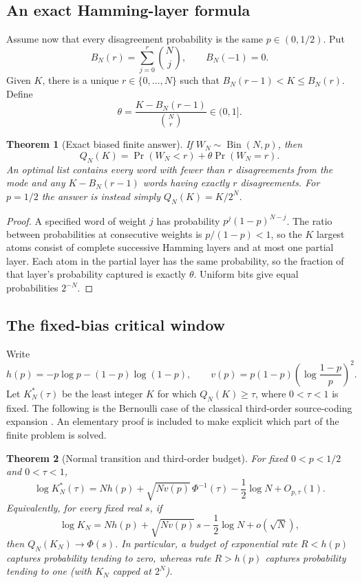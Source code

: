 \documentclass[11pt]{article}
\numberwithin{equation}{section}
\newtheorem{theorem}{Theorem}[section]
\theoremstyle{definition}
\theoremstyle{remark}
\begin{document}
\subsection{An exact Hamming-layer formula}

Assume now that every disagreement probability is the same
$p\in(0,1/2)$.  Put
\[
 B_N(r)=\sum_{j=0}^r\binom Nj,
 \qquad B_N(-1)=0.
\]
Given $K$, there is a unique $r\in\{0,\ldots,N\}$ such that
$B_N(r-1)<K\le B_N(r)$.  Define
\[
 \theta=\frac{K-B_N(r-1)}{\binom Nr}\in(0,1].
\]

\begin{theorem}[Exact biased finite answer]
\label{rbc:thm:binomial-budget}
If $W_N\sim\operatorname{Bin}(N,p)$, then
\[
 \boxed{Q_N(K)=\Pr(W_N<r)+\theta\Pr(W_N=r).}
\]
An optimal list contains every word with fewer than $r$ disagreements
from the mode and any $K-B_N(r-1)$ words having exactly $r$ disagreements.
For $p=1/2$ the answer is instead simply $Q_N(K)=K/2^N$.
\end{theorem}

\begin{proof}
A specified word of weight $j$ has probability $p^j(1-p)^{N-j}$.
The ratio between probabilities at consecutive weights is $p/(1-p)<1$,
so the $K$ largest atoms consist of complete successive Hamming layers
and at most one partial layer.  Each atom in the partial layer has the
same probability, so the fraction of that layer's probability captured
is exactly $\theta$.  Uniform bits give equal probabilities $2^{-N}$.
\end{proof}

\subsection{The fixed-bias critical window}

Write
\[
 h(p)=-p\log p-(1-p)\log(1-p),\qquad
 v(p)=p(1-p)\left(\log\frac{1-p}{p}\right)^2.
\]
Let $K_N^*(\tau)$ be the least integer $K$ for which $Q_N(K)\ge\tau$,
where $0<\tau<1$ is fixed.  The following is the Bernoulli case of the
classical third-order source-coding expansion \cite{kontoyiannis-verdu,chen-effros-kostina}. An elementary proof is
included to make explicit which part of the finite problem is solved.

\begin{theorem}[Normal transition and third-order budget]
\label{rbc:thm:budget-normal}
For fixed $0<p<1/2$ and $0<\tau<1$,
\[
 \log K_N^*(\tau)
   =Nh(p)+\sqrt{Nv(p)}\,\Phi^{-1}(\tau)
      -\frac12\log N+O_{p,\tau}(1).
\]
Equivalently, for every fixed real $s$, if
\[
 \log K_N=Nh(p)+\sqrt{Nv(p)}\,s-\frac12\log N+o(\sqrt N),
\]
then $Q_N(K_N)\to\Phi(s)$.  In particular, a budget of exponential rate
$R<h(p)$ captures probability tending to zero, whereas rate $R>h(p)$
captures probability tending to one (with $K_N$ capped at $2^N$).
\end{theorem}
\end{document}
